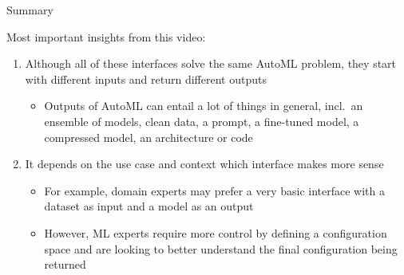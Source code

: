 \documentclass[main]{subfiles}
\begin{document}
\begin{frame}{Summary} 

Most important insights from this video:

\begin{enumerate}
    \item Although all of these interfaces solve the same AutoML problem, they start with different inputs and return different outputs
    \begin{itemize}
        \item Outputs of AutoML can entail a lot of things in general, incl.\ an ensemble of models, clean data, a prompt, a fine-tuned model, a compressed model, an architecture or code
    \end{itemize}
    \item It depends on the use case and context which interface makes more sense
    \begin{itemize}
        \item For example, domain experts may prefer a very basic interface with a dataset as input and a model as an output
        \item However, ML experts require more control by defining a configuration space and are looking to better understand the final configuration being returned
    \end{itemize}
\end{enumerate}


\end{frame}
\end{document}
